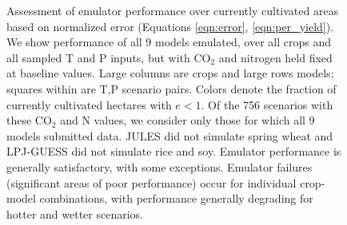 \documentclass[preprint, 5p, times, twocolumn]{elsarticle}
\begin{document}
\begin{figure}[!p]
    \caption{Assessment of emulator performance over currently cultivated areas based on normalized error (Equations \ref{eqn:error}, \ref{eqn:per_yield}). We show performance of all 9 models emulated, over all crops and all sampled T and P inputs, but with CO$_2$ and nitrogen held fixed at baseline values. Large columns are crops and large rows models; squares within are T,P scenario pairs. Colors denote the fraction of currently cultivated hectares with $ e < 1$.  Of the 756 scenarios with these CO$_2$ and N values, we consider only those for which all 9 models submitted data. JULES did not simulate spring wheat and LPJ-GUESS did not simulate rice and soy. Emulator performance is generally satisfactory, with some exceptions. Emulator failures (significant areas of poor performance) occur for individual crop-model combinations, with performance generally degrading for hotter and wetter scenarios.}
   \label{fig:error_360}
\end{figure}
\end{document}
